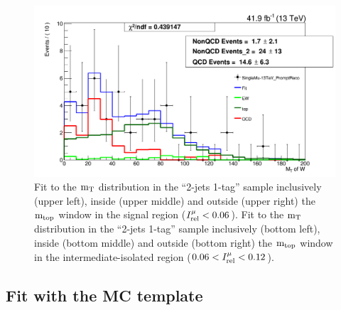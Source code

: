 {\begin{figure}[h!]
{\begin{centering}
\includegraphics[scale=0.2]{figures/2J1T/MTW_fit_2j1t_moreiso_SB_threenonQCDtemplates}
\par\end{centering}
}
\caption{Fit to the ${\rm m_{T}}$ distribution in the \textquotedblleft{}2-jets
1-tag\textquotedblright{} sample inclusively (upper left), inside
(upper middle) and outside (upper right) the ${\rm m_{top}}$ window in
the signal region ($I_{\rm rel}^{\mu} < 0.06$). Fit to the ${\rm m_{T}}$ distribution in the
\textquotedblleft{}2-jets 1-tag\textquotedblright{} sample inclusively
(bottom left), inside (bottom middle) and outside (bottom right) the ${\rm m_{top}}$
window in the intermediate-isolated region ($0.06 < I_{\rm rel}^{\mu} < 0.12$). }
\end{figure}

\clearpage

\subsection{Fit with the MC template}

}
